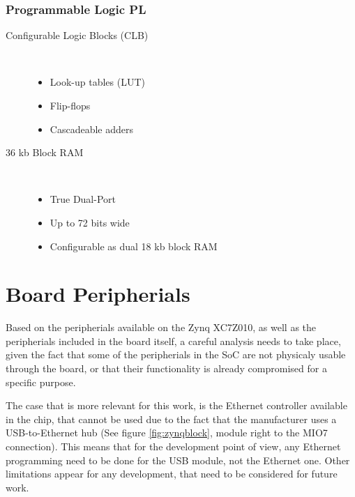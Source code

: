 \subsubsection{Programmable Logic PL}

\begin{description}
	\item[Configurable Logic Blocks (CLB)] \hfill \\
	\begin{itemize}
		\item Look-up tables (LUT)
		\item Flip-flops
		\item Cascadeable adders
	\end{itemize}

	\item[36 kb Block RAM] \hfill \\
	\begin{itemize}
		\item True Dual-Port
		\item Up to 72 bits wide
		\item Configurable as dual 18 kb block RAM
	\end{itemize}

\end{description}


\section{Board Peripherials}

Based on the peripherials available on the Zynq XC7Z010, as well as the peripherials included in the board itself, a careful analysis needs to take place, given the fact that some of the peripherials in the SoC are not physicaly usable through the board, or that their functionality is already compromised for a specific purpose.

The case that is more relevant for this work, is the Ethernet controller available in the chip, that cannot be used due to the fact that the manufacturer uses a USB-to-Ethernet hub (See figure \ref{fig:zynqblock}, module right to the MIO7 connection). This means that for the development point of view, any Ethernet programming need to be done for the USB module, not the Ethernet one. Other limitations appear for any development, that need to be considered for future work.
